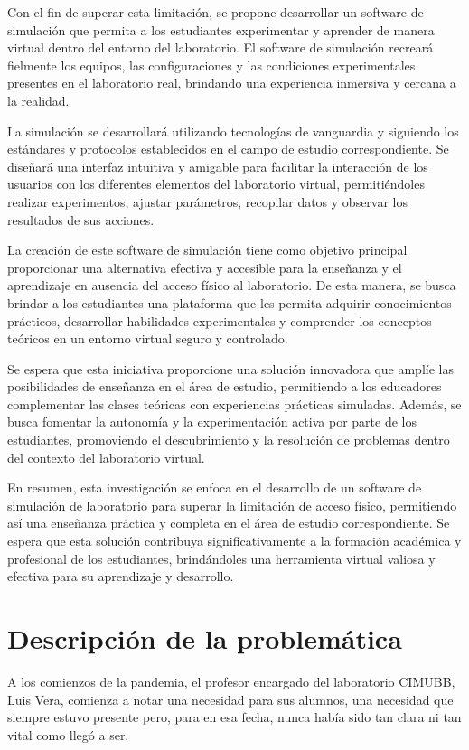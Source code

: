 Con el fin de superar esta limitación, se propone desarrollar un software de simulación que permita a los estudiantes experimentar y aprender de manera virtual dentro del entorno del laboratorio. El software de simulación recreará fielmente los equipos, las configuraciones y las condiciones experimentales presentes en el laboratorio real, brindando una experiencia inmersiva y cercana a la realidad.

La simulación se desarrollará utilizando tecnologías de vanguardia y siguiendo los estándares y protocolos establecidos en el campo de estudio correspondiente. Se diseñará una interfaz intuitiva y amigable para facilitar la interacción de los usuarios con los diferentes elementos del laboratorio virtual, permitiéndoles realizar experimentos, ajustar parámetros, recopilar datos y observar los resultados de sus acciones.

La creación de este software de simulación tiene como objetivo principal proporcionar una alternativa efectiva y accesible para la enseñanza y el aprendizaje en ausencia del acceso físico al laboratorio. De esta manera, se busca brindar a los estudiantes una plataforma que les permita adquirir conocimientos prácticos, desarrollar habilidades experimentales y comprender los conceptos teóricos en un entorno virtual seguro y controlado.

Se espera que esta iniciativa proporcione una solución innovadora que amplíe las posibilidades de enseñanza en el área de estudio, permitiendo a los educadores complementar las clases teóricas con experiencias prácticas simuladas. Además, se busca fomentar la autonomía y la experimentación activa por parte de los estudiantes, promoviendo el descubrimiento y la resolución de problemas dentro del contexto del laboratorio virtual.

En resumen, esta investigación se enfoca en el desarrollo de un software de simulación de laboratorio para superar la limitación de acceso físico, permitiendo así una enseñanza práctica y completa en el área de estudio correspondiente. Se espera que esta solución contribuya significativamente a la formación académica y profesional de los estudiantes, brindándoles una herramienta virtual valiosa y efectiva para su aprendizaje y desarrollo.

\clearpage

\section{Descripción de la problemática}
A los comienzos de la pandemia, el profesor encargado del laboratorio CIMUBB, Luis Vera, comienza a notar una necesidad para sus alumnos, una necesidad que siempre estuvo presente pero, para en esa fecha, nunca había sido tan clara ni tan vital como llegó a ser.

